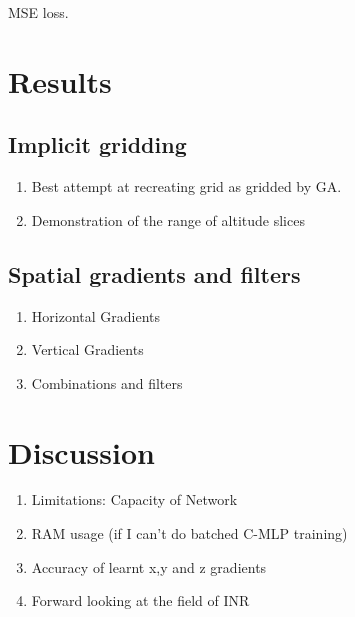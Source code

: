 \documentclass[manuscript.tex]{subfiles}
\begin{document}
MSE loss.


\section{Results}
\subsection{Implicit gridding}
\begin{enumerate}
    \item{} Best attempt at recreating grid as gridded by GA.
    \item{} Demonstration of the range of altitude slices
\end{enumerate}

\subsection{Spatial gradients and filters}
\begin{enumerate}
    \item{} Horizontal Gradients
    \item{} Vertical Gradients
    \item{} Combinations and filters
\end{enumerate}

\section{Discussion}
\begin{enumerate}
    \item{} Limitations: Capacity of Network
    \item{} RAM usage (if I can't do batched C-MLP training)
    \item{} Accuracy of learnt x,y and z gradients
    \item{} Forward looking at the field of INR
\end{enumerate}


\end{document}
